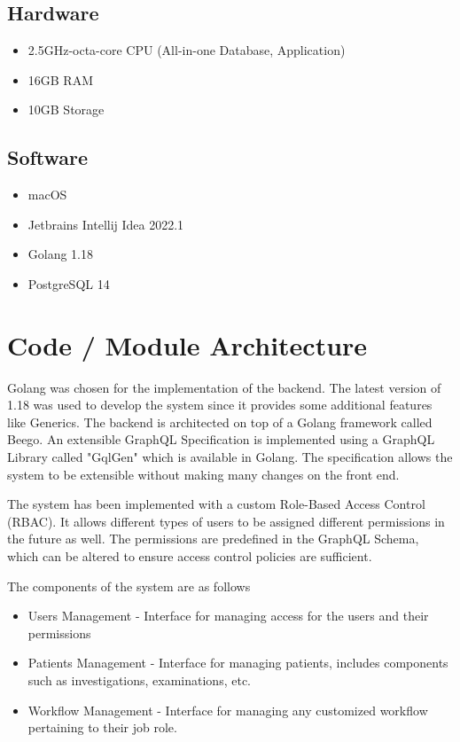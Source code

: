 \documentclass[12pt,a4paper]{report}
\begin{document}
\subsection*{Hardware}

\begin{itemize}
	\item 2.5GHz-octa-core CPU (All-in-one Database, Application)
	\item 16GB RAM
	\item 10GB Storage
\end{itemize}
\subsection*{Software}
\begin{itemize}
\item macOS
\item Jetbrains Intellij Idea 2022.1
\item Golang 1.18
\item PostgreSQL 14
\end{itemize}


\newpage 
\section{Code / Module Architecture}
Golang was chosen for the implementation of the backend. The latest version of 1.18 was used to develop the system since it provides some additional features like Generics. The backend is architected on top of a Golang framework called Beego. An extensible GraphQL Specification is implemented using a GraphQL Library called "GqlGen" which is available in Golang. The specification allows the system to be extensible without making many changes on the front end. 

The system has been implemented with a custom Role-Based Access Control (RBAC). It allows different types of users to be assigned different permissions in the future as well. The permissions are predefined in the GraphQL Schema, which can be altered to ensure access control policies are sufficient.

The components of the system are as follows

\begin{itemize}
	\item Users Management - Interface for managing access for the users and their permissions
	\item Patients Management - Interface for managing patients, includes components such as investigations, examinations, etc.
	\item Workflow Management - Interface for managing any customized workflow pertaining to their job role.

\end{itemize}
\end{document}
